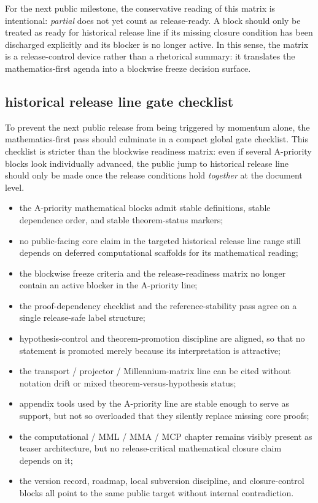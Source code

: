 \documentclass[12pt,a4paper]{article}
\DeclareRobustCommand{\QSCver}[1]{archival stage}
\renewcommand{\QSCver}[1]{historical release line}
\begin{document}
For the next public milestone, the conservative reading of this matrix is intentional: \emph{partial} does not yet count as release-ready. A block should only be treated as ready for \QSCver{v2.27.0} if its missing closure condition has been discharged explicitly and its blocker is no longer active. In this sense, the matrix is a release-control device rather than a rhetorical summary: it translates the mathematics-first agenda into a blockwise freeze decision surface.



\subsection*{\QSCver{v2.27.0} gate checklist}
To prevent the next public release from being triggered by momentum alone, the mathematics-first pass should culminate in a compact global gate checklist. This checklist is stricter than the blockwise readiness matrix: even if several A-priority blocks look individually advanced, the public jump to \QSCver{v2.27.0} should only be made once the release conditions hold \emph{together} at the document level.

\begin{itemize}[leftmargin=*]
 \item the A-priority mathematical blocks admit stable definitions, stable dependence order, and stable theorem-status markers;
 \item no public-facing core claim in the targeted \QSCver{v2.27.0} range still depends on deferred computational scaffolds for its mathematical reading;
 \item the blockwise freeze criteria and the release-readiness matrix no longer contain an active blocker in the A-priority line;
 \item the proof-dependency checklist and the reference-stability pass agree on a single release-safe label structure;
 \item hypothesis-control and theorem-promotion discipline are aligned, so that no statement is promoted merely because its interpretation is attractive;
 \item the transport / projector / Millennium-matrix line can be cited without notation drift or mixed theorem-versus-hypothesis status;
 \item appendix tools used by the A-priority line are stable enough to serve as support, but not so overloaded that they silently replace missing core proofs;
 \item the computational / MML / MMA / MCP chapter remains visibly present as teaser architecture, but no release-critical mathematical closure claim depends on it;
 \item the version record, roadmap, local subversion discipline, and closure-control blocks all point to the same public target without internal contradiction.
\end{itemize}
\end{document}

